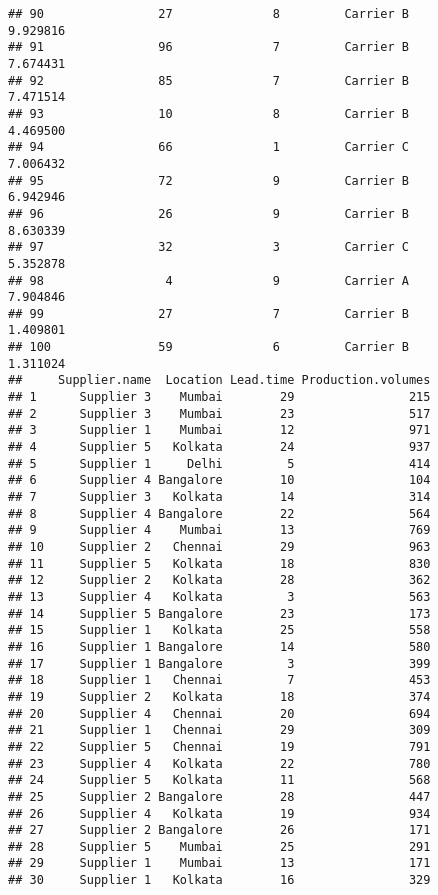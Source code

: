 \documentclass[
]{article}
\begin{document}
\begin{verbatim}
## 90                27              8         Carrier B       9.929816
## 91                96              7         Carrier B       7.674431
## 92                85              7         Carrier B       7.471514
## 93                10              8         Carrier B       4.469500
## 94                66              1         Carrier C       7.006432
## 95                72              9         Carrier B       6.942946
## 96                26              9         Carrier B       8.630339
## 97                32              3         Carrier C       5.352878
## 98                 4              9         Carrier A       7.904846
## 99                27              7         Carrier B       1.409801
## 100               59              6         Carrier B       1.311024
##     Supplier.name  Location Lead.time Production.volumes
## 1      Supplier 3    Mumbai        29                215
## 2      Supplier 3    Mumbai        23                517
## 3      Supplier 1    Mumbai        12                971
## 4      Supplier 5   Kolkata        24                937
## 5      Supplier 1     Delhi         5                414
## 6      Supplier 4 Bangalore        10                104
## 7      Supplier 3   Kolkata        14                314
## 8      Supplier 4 Bangalore        22                564
## 9      Supplier 4    Mumbai        13                769
## 10     Supplier 2   Chennai        29                963
## 11     Supplier 5   Kolkata        18                830
## 12     Supplier 2   Kolkata        28                362
## 13     Supplier 4   Kolkata         3                563
## 14     Supplier 5 Bangalore        23                173
## 15     Supplier 1   Kolkata        25                558
## 16     Supplier 1 Bangalore        14                580
## 17     Supplier 1 Bangalore         3                399
## 18     Supplier 1   Chennai         7                453
## 19     Supplier 2   Kolkata        18                374
## 20     Supplier 4   Chennai        20                694
## 21     Supplier 1   Chennai        29                309
## 22     Supplier 5   Chennai        19                791
## 23     Supplier 4   Kolkata        22                780
## 24     Supplier 5   Kolkata        11                568
## 25     Supplier 2 Bangalore        28                447
## 26     Supplier 4   Kolkata        19                934
## 27     Supplier 2 Bangalore        26                171
## 28     Supplier 5    Mumbai        25                291
## 29     Supplier 1    Mumbai        13                171
## 30     Supplier 1   Kolkata        16                329

\end{verbatim}
\end{document}
